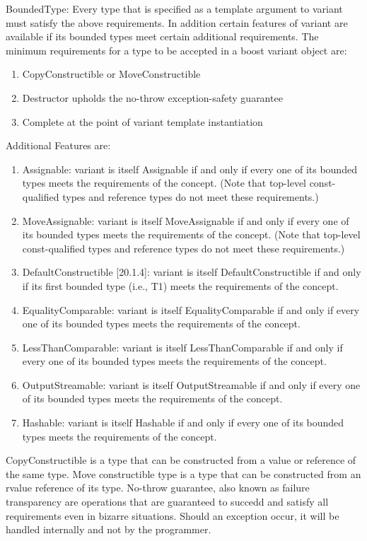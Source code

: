 \documentclass[letterpaper, 12pt]{article}
\begin{document}
BoundedType:
Every type that is specified as a template argument to variant must satisfy the above requirements. In addition certain
features of variant are available if its bounded types meet certain additional requirements. The minimum requirements for
a type to be accepted in a boost variant object are:
\begin{enumerate}
 \item CopyConstructible or MoveConstructible
 \item Destructor upholds the no-throw exception-safety guarantee
 \item Complete at the point of variant template instantiation
\end{enumerate}

Additional Features are:
\begin{enumerate}
 \item Assignable: variant is itself Assignable if and only if every one of its bounded
 types meets the requirements of the concept. (Note that top-level const-qualified
 types and reference types do not meet these requirements.)
 \item MoveAssignable: variant is itself MoveAssignable if and only if every one of its
 bounded types meets the requirements of the concept. (Note that top-level const-qualified
 types and reference types do not meet these requirements.)
 \item DefaultConstructible [20.1.4]: variant is itself DefaultConstructible if and only
 if its first bounded type (i.e., T1) meets the requirements of the concept.
 \item EqualityComparable: variant is itself EqualityComparable if and only if every one
 of its bounded types meets the requirements of the concept.
 \item LessThanComparable: variant is itself LessThanComparable if and only if every one
 of its bounded types meets the requirements of the concept.
 \item OutputStreamable: variant is itself OutputStreamable if and only if every one of
 its bounded types meets the requirements of the concept.
 \item Hashable: variant is itself Hashable if and only if every one of its bounded types
 meets the requirements of the concept.
\end{enumerate}

CopyConstructible is a type that can be constructed from a value or reference of the same
type. Move constructible type is a type that can be constructed from an rvalue reference of its type.
No-throw guarantee, also known as failure transparency are operations that are guaranteed to
succedd and satisfy all requirements even in bizarre situations. Should an exception
occur, it will be handled internally and not by the programmer.
\par\vspace{\baselineskip}
\end{document}

